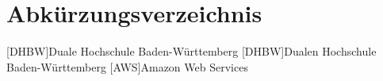 \section*{Abkürzungsverzeichnis}
\begin{acronym}
  [DHBW]{Duale Hochschule Ba\-den-\-Würt\-tem\-berg}
  [DHBW]{Dualen Hochschule Ba\-den-\-Würt\-tem\-berg}
  [AWS]{Amazon Web Services}
\end{acronym}
\newpage